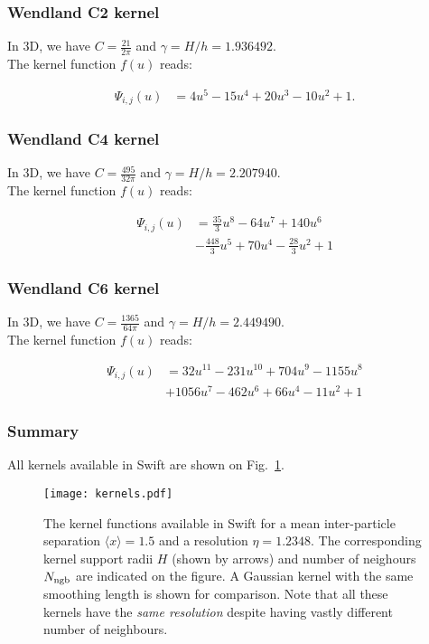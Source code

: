 \documentclass[fleqn, usenatbib, useAMS,a4paper]{mnras}
\newcommand{\swift}{{\sc Swift}\xspace}
\begin{document}
\subsubsection{Wendland C2 kernel}

In 3D, we have $C=\frac{21}{2\pi}$ and $\gamma=H/h = 1.936492$.\\
The kernel function $f(u)$ reads:

\begin{align}
  \Psi_{i,j}(u) &= 4u^5 - 15u^4 + 20u^3 - 10u^2 + 1.
    \nonumber
\end{align}


\subsubsection{Wendland C4 kernel}

In 3D, we have $C=\frac{495}{32\pi}$ and $\gamma=H/h = 2.207940$.\\
The kernel function $f(u)$ reads:

\begin{align}
  \Psi_{i,j}(u) &= \frac{35}{3}u^8 - 64u^7 + 140u^6     \nonumber\\
  & - \frac{448}{3}u^5 + 70u^4 - \frac{28}{3}u^2 + 1
    \nonumber
\end{align}


\subsubsection{Wendland C6 kernel}

In 3D, we have $C=\frac{1365}{64\pi}$ and $\gamma=H/h = 2.449490$.\\
The kernel function $f(u)$ reads:

\begin{align}
  \Psi_{i,j}(u) &= 32u^{11} - 231u^{10} + 704u^9 - 1155u^8     \nonumber\\
  & + 1056u^7 - 462u^6 + 66u^4 - 11u^2 + 1
    \nonumber
\end{align}


\subsubsection{Summary}

All kernels available in \swift are shown on Fig.~\ref{fig:sph:kernels}.

\begin{figure}
\texttt{[image: kernels.pdf]}
\caption{The kernel functions available in \swift for a mean
  inter-particle separation $\langle x\rangle=1.5$ and a resolution
  $\eta=1.2348$. The corresponding kernel support radii $H$ (shown by
  arrows) and number of neighours $N_{\rm ngb}$ are indicated on the
  figure. A Gaussian kernel with the same smoothing length is shown
  for comparison. Note that all these kernels have the \emph{same
    resolution} despite having vastly different number of neighbours.}
\label{fig:sph:kernels}
\end{figure}
\end{document}

